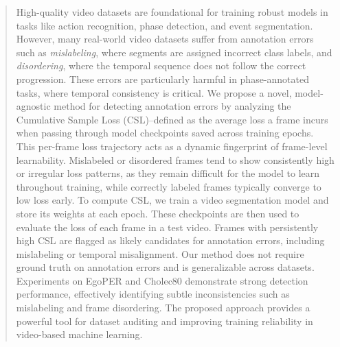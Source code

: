 \documentclass{article}
\theoremstyle{plain}
\theoremstyle{definition}
\theoremstyle{remark}
\begin{document}
\begin{abstract}
  High-quality video datasets are foundational for training robust models in tasks like action recognition, phase detection, and event segmentation. However, many real-world video datasets suffer from annotation errors such as \textit{mislabeling}, where segments are assigned incorrect class labels, and \textit{disordering}, where the temporal sequence does not follow the correct progression. These errors are particularly harmful in phase-annotated tasks, where temporal consistency is critical. We propose a novel, model-agnostic method for detecting annotation errors by analyzing the Cumulative Sample Loss (CSL)--defined as the average loss a frame incurs when passing through model checkpoints saved across training epochs. This per-frame loss trajectory acts as a dynamic fingerprint of frame-level learnability. Mislabeled or disordered frames tend to show consistently high or irregular loss patterns, as they remain difficult for the model to learn throughout training, while correctly labeled frames typically converge to low loss early. To compute CSL, we train a video segmentation model and store its weights at each epoch. These checkpoints are then used to evaluate the loss of each frame in a test video. Frames with persistently high CSL are flagged as likely candidates for annotation errors, including mislabeling or temporal misalignment. Our method does not require ground truth on annotation errors and is generalizable across datasets. Experiments on EgoPER and Cholec80 demonstrate strong detection performance, effectively identifying subtle inconsistencies such as mislabeling and frame disordering. The proposed approach provides a powerful tool for dataset auditing and improving training reliability in video-based machine learning.

\end{abstract}
\vspace{0.2em}
\end{document}
